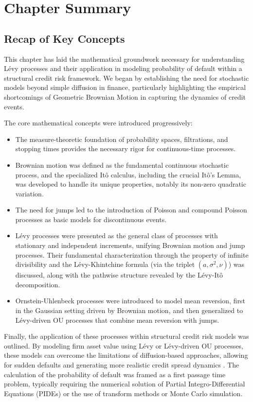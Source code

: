 \documentclass[11pt,twoside,openright]{report}
\begin{document}
\section{Chapter Summary}
\label{sec:summary_roadmap}

\subsection{Recap of Key Concepts}
\label{subsec:recap}

This chapter has laid the mathematical groundwork necessary for understanding Lévy processes and their application in modeling probability of default within a structural credit risk framework. We began by establishing the need for stochastic models beyond simple diffusion in finance, particularly highlighting the empirical shortcomings of Geometric Brownian Motion in capturing the dynamics of credit events.

The core mathematical concepts were introduced progressively:
\begin{itemize}
    \item The measure-theoretic foundation of probability spaces, filtrations, and stopping times provides the necessary rigor for continuous-time processes.
    \item Brownian motion was defined as the fundamental continuous stochastic process, and the specialized Itô calculus, including the crucial Itô's Lemma, was developed to handle its unique properties, notably its non-zero quadratic variation.
    \item The need for jumps led to the introduction of Poisson and compound Poisson processes as basic models for discontinuous events.
    \item Lévy processes were presented as the general class of processes with stationary and independent increments, unifying Brownian motion and jump processes. Their fundamental characterization through the property of infinite divisibility and the Lévy-Khintchine formula (via the triplet $(a, \sigma^2, \nu)$) was discussed, along with the pathwise structure revealed by the Lévy-Itô decomposition.
    \item Ornstein-Uhlenbeck processes were introduced to model mean reversion, first in the Gaussian setting driven by Brownian motion, and then generalized to Lévy-driven OU processes that combine mean reversion with jumps.
\end{itemize}
Finally, the application of these processes within structural credit risk models was outlined. By modeling firm asset value using Lévy or Lévy-driven OU processes, these models can overcome the limitations of diffusion-based approaches, allowing for sudden defaults and generating more realistic credit spread dynamics \cite{schoutens2010levy}. The calculation of the probability of default was framed as a first passage time problem, typically requiring the numerical solution of Partial Integro-Differential Equations (PIDEs) or the use of transform methods or Monte Carlo simulation.
\end{document}
